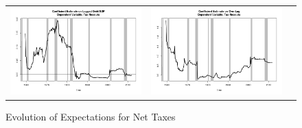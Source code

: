 \documentclass[12pt]{article}
\begin{document}
\begin{figure}\caption{Evolution of Expectations for Net Taxes}\label{fg:exp_tax}
\begin{center}
\hspace*{-0.2in}\begin{tabular}{ccc}
\includegraphics[scale=0.34]{pics/coef_tax_debt.png} & \includegraphics[scale=0.34]{pics/coef_tax_lag.png} \\

\end{tabular}
\end{center}
\end{figure}
\end{document}
